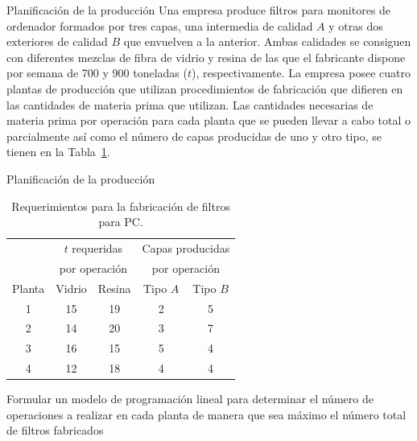 \documentclass[../../main.tex]{subfiles}
\begin{document}
\begin{frame}{Planificación de la producción}{}
  Una empresa produce filtros para monitores de ordenador formados por tres capas, una intermedia de calidad $A$ y otras dos exteriores de calidad $B$ que envuelven a la anterior. Ambas calidades se consiguen con diferentes mezclas de fibra de vidrio y resina de las que el fabricante dispone  por semana de 700 y 900 toneladas ($t$), respectivamente. La empresa posee cuatro plantas de producción que utilizan procedimientos de fabricación que difieren en las cantidades de materia prima que utilizan. Las cantidades necesarias de materia prima por operación para cada planta que se pueden llevar a cabo total o parcialmente así como el número de capas producidas de uno y otro tipo, se tienen en la Tabla~\ref{tab:info}.

\end{frame}

\begin{frame}{Planificación de la producción}{}

  \begin{table}
    \caption[requerimientos]{\label{tab:info}Requerimientos para la fabricación de filtros para PC.}
    \centering
    \begin{tabular}{ccccc}
      \toprule
      ~ & \multicolumn{2}{c}{$t$ requeridas} & \multicolumn{2}{c}{Capas producidas}\\
      ~& \multicolumn{2}{c}{por operación}& \multicolumn{2}{c}{por operación}\\
      \cmidrule{2-5}
      Planta& Vidrio& Resina& Tipo $A$& Tipo $B$\\
      \midrule
      1& 15& 19& 2& 5\\
      2& 14& 20& 3& 7\\
      3& 16& 15& 5& 4\\
      4 & 12& 18& 4& 4\\
      \bottomrule
    \end{tabular}

  \end{table}
  Formular un modelo de programación lineal para determinar el número de operaciones a realizar en cada planta de manera que sea máximo el número total de filtros fabricados
\end{frame}
\end{document}

